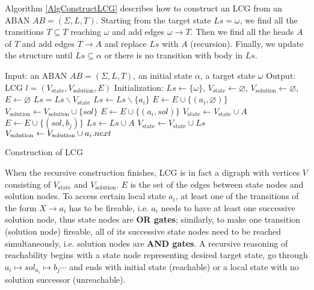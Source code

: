 \documentclass{entcs}
\begin{document}
Algorithm \ref{AlgConstructLCG} describes how to construct an LCG from an ABAN $AB = (\Sigma,L,T)$.
Starting from the target state $Ls=\omega$, we find all the transitions $T\subseteq T$ reaching $\omega$ and add edges $\omega \to T$.
Then we find all the heads $A$ of $T$ and add edges $T \to A$ and replace $Ls$ with $A$ (recursion).
Finally, we update the structure until $Ls\subseteq \alpha$ or there is no transition with body in $Ls$.

\begin{algorithm}[htb]
\begin{algorithmic}
\State Input: an ABAN $AB=(\Sigma,L,T)$, an initial state $\alpha$, a target state $\omega$
\State Output: LCG $l=(V_{\mathrm{state}},V_{\mathrm{solution}}, E)$
\State Initialization: 
$Ls\gets \{\omega\}$, $V_{\mathrm{state}}\gets\varnothing$, $V_{\mathrm{solution}}\gets \varnothing$, $E\gets \varnothing$
    \State $Ls=Ls\backslash V_{\mathrm{state}}$
		\State $Ls\gets Ls\backslash \{a_i\}$
			\State $E\gets E\cup \{(a_i,\varnothing)\} $
    	\Else
    		    \State $V_{\mathrm{solution}}\gets V_{\mathrm{solution}}\cup \{sol\}$
    		    \State $E\gets E\cup \{(a_i,sol)\} $
    			\State $V_{\mathrm{state}}\gets V_{\mathrm{state}}\cup {A}$
    				\State $E\gets E\cup \{(sol,b_j)\} $
    			\EndFor
    			\State $Ls\gets Ls\cup A$
                \State $V_{\mathrm{state}}\gets V_{\mathrm{state}}\cup Ls$
    		\EndFor
    		\State$V_{\mathrm{solution}}\gets V_{\mathrm{solution}}\cup a_i{\rm .next}$           
    	\EndIf
	\EndFor
\EndWhile
\State{}
\end{algorithmic}
\caption{Construction of LCG}\label{AlgConstructLCG}
\end{algorithm}

When the recursive construction finishes, LCG is in fact a digraph with vertices $V$ consisting of $V_{\mathrm{state}}$ and $V_{\mathrm{solution}}$. 
$E$ is the set of the edges between state nodes and solution nodes. 
To access certain local state $a_i$, at least one of the transitions of the form $X\to a_i$ has to be fireable, i.e. $a_i$ needs to have at least one successive solution node, thus state nodes are \textbf{OR gates}; similarly, to make one transition (solution node) fireable, all of its successive state nodes need to be reached simultaneously, i.e. solution nodes are \textbf{AND gates}. 
A recursive reasoning of reachability begins with a state node representing desired target state, go through $a_i\mapsto sol_{a_i}\mapsto b_j \cdots$ and ends with initial state (reachable) or a local state with no solution successor (unreachable).
\end{document}
